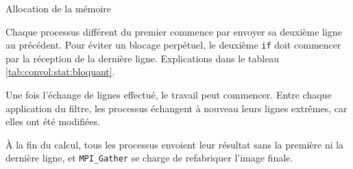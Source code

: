 \begin{algorithm*}
  \caption{Allocation de la mémoire}
  \label{alg:convol:stat:mem}



\end{algorithm*}

Chaque processus différent du premier commence par envoyer sa deuxième
ligne au précédent. Pour éviter un blocage perpétuel, le deuxième
\texttt{if} doit commencer par la réception de la dernière
ligne. Explications dans le tableau \ref{tab:convol:stat:bloquant}.

Une fois l'échange de lignes effectué, le travail peut
commencer. Entre chaque application du filtre, les processus échangent
à nouveau leurs lignes extrêmes, car elles ont été modifiées.

À la fin du calcul, tous les processus envoient leur résultat sans la
première ni la dernière ligne, et \texttt{MPI\_Gather} se charge de
refabriquer l'image finale.

